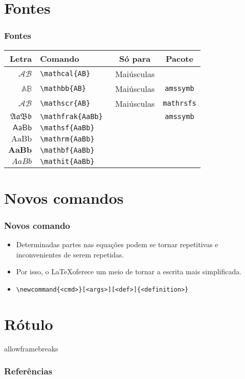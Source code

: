 \documentclass[brazilian]{beamer}
\begin{document}
\section{Fontes}
\begin{frame}[fragile]
    \frametitle{Fontes}

    \begin{table}
        \begin{tabular}{rlcc}
            Letra & Comando & Só para & Pacote\\ \hline
            \(\mathcal{AB} \) & \lstinline[style=myStyleLatex]!\mathcal{AB} ! & Maiúsculas & \\ \hline
            \(\mathbb{AB} \) & \lstinline[style=myStyleLatex]!\mathbb{AB} ! & Maiúsculas & \texttt{amssymb} \\ \hline
            \(\mathscr{AB}\) & \lstinline[style=myStyleLatex]!\mathscr{AB}! & Maiúsculas & \texttt{mathrsfs} \\ \hline
            \(\mathfrak{AaBb} \) & \lstinline[style=myStyleLatex]!\mathfrak{AaBb} ! & & \texttt{amssymb}\\ \hline
            \(\mathsf{AaBb} \) & \lstinline[style=myStyleLatex]!\mathsf{AaBb} ! & & \\ \hline
            \(\mathrm{AaBb} \) & \lstinline[style=myStyleLatex]!\mathrm{AaBb} ! & & \\ \hline
            \(\mathbf{AaBb} \) & \lstinline[style=myStyleLatex]!\mathbf{AaBb} ! & & \\ \hline
            \(\mathit{AaBb}\) & \lstinline[style=myStyleLatex]!\mathit{AaBb} ! & & \\ \hline            
        \end{tabular}
    \end{table}

\end{frame}
\section{Novos comandos}
\begin{frame}[fragile]
    \frametitle{Novos comando}

    \begin{itemize}
        \item Determinadas partes nas equações podem se tornar repetitivas e inconvenientes de serem repetidas. 
        \item Por isso, o \LaTeX oferece um meio de tornar a escrita mais simplificada.
        \item \lstinline[style=myStyleLatex]!\newcommand{<cmd>}[<args>][<def>]{<definition>}!
    \end{itemize}

\end{frame}

\section{Rótulo}

\begin{frame}{allowframebreaks}
    \frametitle{Referências}
    \nocite{*}
    \printbibliography[keyword={inserirEquacao}]
\end{frame}
\end{document}
